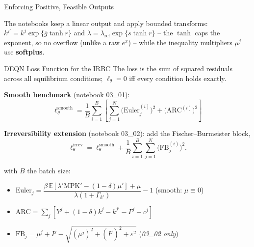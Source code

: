 \documentclass[aspectratio=169,11pt]{beamer}
\newcommand{\emphc}[1]{\textcolor{harvardcrimson}{#1}}
\newcommand{\E}[1]{\mathbb{E}\!\left[#1\right]}
\begin{document}
\begin{frame}{Enforcing Positive, Feasible Outputs}
\begin{center}
\end{center}

\vspace{0.2em}
{\small
The notebooks keep a \emphc{linear} output and apply bounded transforms: $k^{j\prime}=k^j\exp\{\bar g\tanh r\}$ and $\lambda=\lambda_{\text{ref}}\exp\{s\tanh r\}$ -- the $\tanh$ caps the exponent, so no overflow (unlike a raw $e^x$) -- while the inequality multipliers $\mu^j$ use \textbf{softplus}.
}
\end{frame}

\begin{frame}{DEQN Loss Function for the IRBC}
\footnotesize
The loss is the \emphc{sum of squared residuals} across all equilibrium conditions; $\ell_\theta = 0$ iff every condition holds exactly.

\vspace{0.15em}
\textbf{Smooth benchmark} (notebook 03\_01):
\[
\boxed{
\ell^{\mathrm{smooth}}_\theta = \frac{1}{B}\sum_{i=1}^{B} \left[\sum_{j=1}^{N} \bigl(\text{Euler}_j^{(i)}\bigr)^2 + \bigl(\text{ARC}^{(i)}\bigr)^2\right]
}
\]

\vspace{0.1em}
\textbf{Irreversibility extension} (notebook 03\_02): add the Fischer--Burmeister block,
\[
\ell^{\mathrm{irrev}}_\theta = \ell^{\mathrm{smooth}}_\theta + \frac{1}{B}\sum_{i=1}^{B}\sum_{j=1}^{N}\bigl(\text{FB}_j^{(i)}\bigr)^2.
\]

\vspace{0.1em}
with $B$ the batch size:
\begin{itemize}\itemsep0pt
    \item $\text{Euler}_j = \dfrac{\beta\,\E{\lambda' \text{MPK}' - (1-\delta)\mu'} + \mu}{\lambda(1+\Gamma_{k'})} - 1$ \quad (smooth: $\mu \equiv 0$)
    \item $\text{ARC} = \sum_j [Y^j + (1-\delta)k^j - k^{j\prime} - \Gamma^j - c^j]$
    \item $\text{FB}_j = \mu^j + I^j - \sqrt{(\mu^j)^2 + (I^j)^2 + \varepsilon^2}$ \quad (\emph{03\_02 only})
\end{itemize}
\end{frame}
\end{document}
